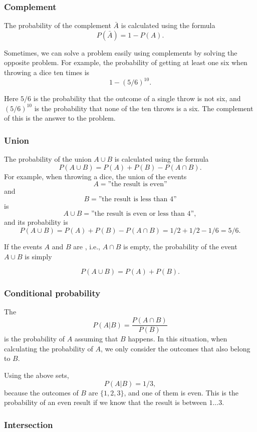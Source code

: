 \subsubsection{Complement}

The probability of the complement
$\bar A$ is calculated using the formula
\[P(\bar A)=1-P(A).\]

Sometimes, we can solve a problem easily
using complements by solving the opposite problem.
For example, the probability of getting
at least one six when throwing a dice ten times is
\[1-(5/6)^{10}.\]

Here $5/6$ is the probability that the outcome
of a single throw is not six, and
$(5/6)^{10}$ is the probability that none of
the ten throws is a six.
The complement of this is the answer to the problem.

\subsubsection{Union}

The probability of the union $A \cup B$
is calculated using the formula
\[P(A \cup B)=P(A)+P(B)-P(A \cap B).\]
For example, when throwing a dice,
the union of the events
\[A=\textrm{''the result is even''}\]
and
\[B=\textrm{''the result is less than 4''}\]
is
\[A \cup B=\textrm{''the result is even or less than 4''},\]
and its probability is
\[P(A \cup B) = P(A)+P(B)-P(A \cap B)=1/2+1/2-1/6=5/6.\]

If the events $A$ and $B$ are , i.e.,
$A \cap B$ is empty,
the probability of the event $A \cup B$ is simply

\[P(A \cup B)=P(A)+P(B).\]

\subsubsection{Conditional probability}


The 
\[P(A | B) = \frac{P(A \cap B)}{P(B)}\]
is the probability of $A$
assuming that $B$ happens.
In this situation, when calculating the
probability of $A$, we only consider the outcomes
that also belong to $B$.

Using the above sets,
\[P(A | B)= 1/3,\]
because the outcomes of $B$ are
$\{1,2,3\}$, and one of them is even.
This is the probability of an even result
if we know that the result is between $1 \ldots 3$.

\subsubsection{Intersection}

